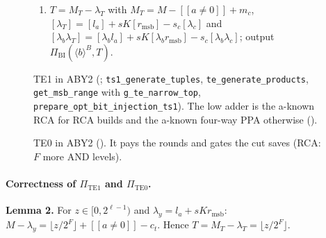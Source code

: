\begin{figure}[t]
{\begin{minipage}{0.95\linewidth}
\begin{enumerate}
\item $T = M_T - \lambda_T$ with $M_T = M - [\![a \neq 0]\!] + m_c$,
  $[\lambda_T] = [l_a] + s K [r_{\mathrm{msb}}] - s_c [\lambda_c]$ and
  $[\lambda_b \lambda_T] = [\lambda_b l_a] + s K [\lambda_b r_{\mathrm{msb}}] - s_c [\lambda_b \lambda_c]$;
  output $\Pi_{\mathrm{BI}}(\langle b \rangle^B, T)$.
\end{enumerate}
\end{minipage}}
\caption{TE1 in ABY2 (; \texttt{ts1\_generate\_tuples}, \texttt{te\_generate\_products},
\texttt{get\_msb\_range} with \texttt{g\_te\_narrow\_top}, \texttt{prepare\_opt\_bit\_injection\_ts1}). The low adder
is the a-known RCA for RCA builds and the a-known four-way PPA otherwise ().}
\label{fig:te1proto}
\end{figure}

\begin{figure}[t]
\centering\small
{}
\caption{TE0 in ABY2 (). It pays the rounds and gates the cut saves (RCA: $F$ more AND levels).}
\label{fig:te0proto}
\end{figure}

\paragraph{Correctness of $\Pi_{\mathrm{TE1}}$ and $\Pi_{\mathrm{TE0}}$.} \textbf{Lemma 2.} For $z \in [0, 2^{\ell-1})$
and $\lambda_y = l_a + s K r_{\mathrm{msb}}$: $M - \lambda_y = \lfloor z / 2^F \rfloor + [\![a \neq 0]\!] - c_t$.
Hence $T = M_T - \lambda_T = \lfloor z / 2^F \rfloor$.

